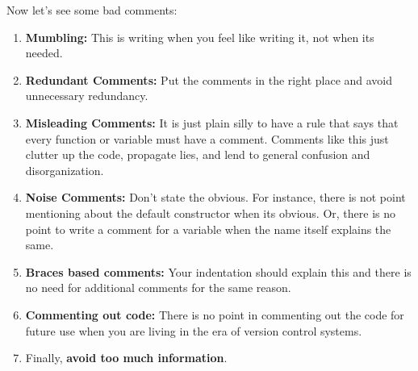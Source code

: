 \documentclass[12pt]{article}
\begin{document}
Now let's see some bad comments:
\begin{enumerate}
    \item \textbf{Mumbling: }This is writing when you feel like writing it, not when its needed.
    \item \textbf{Redundant Comments: }Put the comments in the right place and avoid unnecessary redundancy.
    
    \item \textbf{Misleading Comments: }It is just plain silly to have a rule that says that every function or variable must have a comment. Comments like this just clutter up the code, propagate lies, and lend to general confusion and disorganization.
    \item \textbf{Noise Comments: } Don't state the obvious. For instance, there is not point mentioning about the default constructor when its obvious. Or, there is no point to write a comment for a variable when the name itself explains the same.
    \item \textbf{Braces based comments: }Your indentation should explain this and there is no need for additional comments for the same reason.
    \item \textbf{Commenting out code: }There is no point in commenting out the code for future use when you are living in the era of version control systems.
    \item Finally, \textbf{avoid too much information}.
\end{enumerate}
\end{document}
